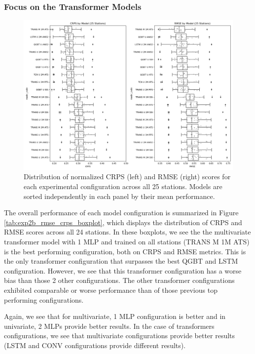 \documentclass[12pt,a4paper]{book}
\begin{document}
\subsubsection{Focus on the Transformer Models}

\begin{figure}[h!]
  \centering
  \includegraphics[width=\textwidth]{exp2b_rmse_crps.png} 
  \caption{Distribution of normalized CRPS (left) and RMSE (right) scores for each experimental configuration across all 25 stations. Models are sorted independently in each panel by their mean performance.}
  \label{fig:exp2b_rmse_crps_boxplot}
\end{figure}

The overall performance of each model configuration is summarized in Figure \ref{tab:exp2b_rmse_crps_boxplot}, which displays the distribution of CRPS and RMSE scores across all 24 stations. In these boxplots, we see the the multivariate transformer model with 1 MLP and trained on all stations (TRANS M 1M ATS) is the best performing configuration, both on CRPS and RMSE metrics. This is the only transformer configuration that surpasses the best QGBT and LSTM configuration. However, we see that this transformer configuration has a worse bias than those 2 other configurations. The other transformer configurations exhibited comparable or worse performance  than of those previous top performing configurations. 

Again, we see that for multivariate, 1 MLP configuration is better and in univariate, 2 MLPs provide better results. In the case of transformers configurations, we see that multivariate configurations provide better results (LSTM and CONV configurations provide different results).
\end{document}
